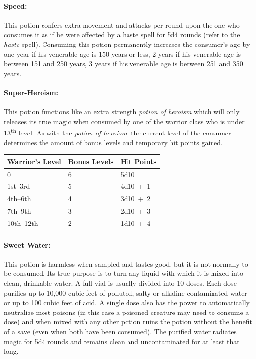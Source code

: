 \begin{multicols}{2}
\paragraph{Speed:} This potion confers extra movement and attacks per round upon the one who consumes it as if he were affected by a haste spell for 5d4 rounds (refer to the \textit{haste} spell).  Consuming this potion permanently increases the consumer's age by one year if his venerable age is 150 years or less, 2 years if his venerable age is between 151 and 250 years, 3 years if his venerable age is between 251 and 350 years.

\paragraph{Super-Heroism:} This potion functions like an extra strength \textit{potion of heroism} which will only releases its true magic when consumed by one of the warrior class who is under 13\textsuperscript{th} level.  As with the \textit{potion of heroism}, the current level of the consumer determines the amount of bonus levels and temporary hit points gained.

\noindent
\begin{tabular}{|p{}|p{}|p{}|}
\hline
Warrior's Level	& Bonus Levels	& Hit Points \\
\hline\hline
\rowcolor[gray]{.9}0	& 6	& 5d10 \\
1st--3rd	& 5	& 4d10~+~1 \\
\rowcolor[gray]{.9}4th--6th	& 4	& 3d10~+~2 \\
7th--9th	& 3	& 2d10~+~3 \\
\rowcolor[gray]{.9}10th--12th	& 2	& 1d10~+~4 \\
\hline
\end{tabular}

\paragraph{Sweet Water:} This potion is harmless when sampled and tastes good, but it is not normally to be consumed.  Its true purpose is to turn any liquid with which it is mixed into clean, drinkable water.  A full vial is usually divided into 10 doses.  Each dose purifies up to 10,000 cubic feet of polluted, salty or alkaline contaminated water or up to 100 cubic feet of acid.  A single dose also has the power to automatically neutralize most poisons (in this case a poisoned creature may need to consume a dose) and when mixed with any other potion ruins the potion without the benefit of a save (even when both have been consumed).  The purified water radiates magic for 5d4 rounds and remains clean and uncontaminated for at least that long.


\end{multicols}
